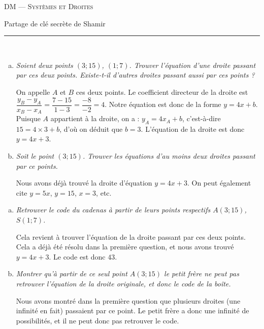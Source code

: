 \documentclass[11pt]{article}
\begin{document}
\begin{center}
  \textsc{DM --- Systèmes et Droites}

  {
    \Large
    Partage de clé secrète de Shamir
    \hrule
  }
\end{center}

\begin{question}~
  \begin{enumerate}[(a)]
    \item \emph{Soient deux points $(3; 15)$, $(1; 7)$. Trouver l'équation d'une
      droite passant par ces deux points.  Existe-t-il d'autres droites
    passant aussi par ces points ?}

    On appelle $A$ et $B$ ces deux points. Le coefficient directeur de la droite est $\dfrac{y_B-y_A}{x_B-x_A}=\dfrac{7-15}{1-3}=\dfrac{-8}{-2}=4$. Notre équation est donc de la forme $y=4x+b$. Puisque $A$ appartient à la droite, on a : $y_A=4x_A+b$, c'est-à-dire $15=4\times3+b$, d'où on déduit que $b=3$. L'équation de la droite est donc $y=4x+3$.
  \item \emph{Soit le point $(3; 15)$. Trouver les équations d'au moins deux
    droites passant par ce points.}

    Nous avons déjà trouvé la droite d'équation $y=4x+3$. On peut également cite $y=5x$, $y=15$, $x=3$, etc.
  \end{enumerate}
\end{question}

\begin{question}
  \label{ssss}
  \begin{enumerate}[(a)]
    \item \emph{Retrouver le code du cadenas à partir de leurs points respectifs $A(3; 15)$, $S(1;7)$.}

      Cela revient à trouver l'équation de la droite passant par ces deux points. Cela a déjà été résolu dans la première question, et nous avons trouvé $y=4x+3$. Le code est donc $43$.
    \item \emph{Montrer qu'à partir de ce seul point $A(3 ; 15)$ le petit frère
      ne peut pas retrouver l'équation de la droite originale, et donc le
    code de la boîte.}

    Nous avons montré dans la première question que plusieurs droites (une infinité en fait) passaient par ce point. Le petit frère a donc une infinité de possibilités, et il ne peut donc pas retrouver le code.
  \end{enumerate}
\end{question}
\end{document}
